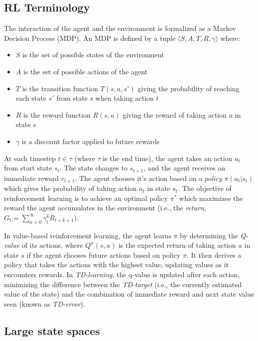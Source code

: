 \documentclass[letterpaper]{article}
\begin{document}
	\subsection{RL Terminology}
	 
	 The interaction of the agent and the environment is formalized as a Markov Decision Process (MDP). An MDP is defined by a tuple $\langle S, A, T, R, \gamma \rangle$ where:
	 \begin{itemize}
	 	\item $S$ is the set of possible states of the environment
	 	\item $A$ is the set of possible actions of the agent
	 	\item $T$ is the transition function $T(s,a,s')$ giving the probability of reaching each state $s'$ from state $s$ when taking action $t$
	 	\item $R$ is the reward function $R(s,a)$ giving the reward of taking action $a$ in state $s$
	 	\item $\gamma$ is a discount factor applied to future rewards
	 \end{itemize}
 	
 	At each timestep $t\in \tau$ (where $\tau$ is the end time), the agent takes an action $a_t$ from start state $s_t$. The state changes to $s_{t+1}$, and the agent receives an immediate reward $r_{t+1}$. The agent chooses it's action based on a \textit{policy} $\pi (a_t|s_t)$ which gives the probability of taking action $a_t$ in state $s_t$. The objective of reinforcement learning is to achieve an optimal policy $\pi^*$ which maximizes the reward the agent accumulates in the environment (i.e., the \textit{return}, $G_t=\sum_{n=0}^{\infty}\gamma^k_tR_{t+k+1}$). 
 	
 	In value-based reinforcement learning, the agent learns $\pi$ by determining the \textit{Q-value} of its actions, where $Q^\pi(s,a)$ is the expected return of taking action $a$ in state $s$ if the agent chooses future actions based on policy $\pi$. It then derives a policy that takes the actions with the highest value, updating values as it encounters rewards. In \textit{TD-learning}, the q-value is updated after each action, minimizing the difference between the \textit{TD-target} (i.e., the currently estimated value of the state) and the combination of immediate reward and next state value seen (known as \textit{TD-error}).
 	
 	\subsection{Large state spaces}
 	
\end{document}
